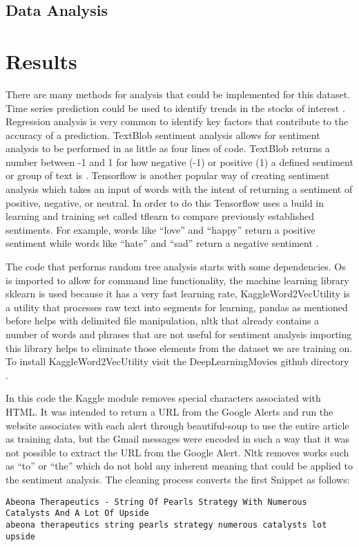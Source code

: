 \documentclass[sigconf]{acmart}
\begin{document}
\subsection{Data Analysis}



\section{Results}
There are many methods for analysis that could be implemented for this dataset. Time series prediction could be used to identify trends in the stocks of interest \cite{ARMANO}. Regression analysis is very common to identify key factors that contribute to the accuracy of a  prediction. TextBlob sentiment analysis allows for sentiment analysis to be performed in as little as four lines of code. TextBlob returns a number between -1 and 1 for how negative (-1) or positive (1) a defined sentiment or group of text is \cite{www-textblob}. Tensorflow is another popular way of creating sentiment analysis which takes an input of words with the intent of returning a sentiment of positive, negative, or neutral. In order to do this Tensorflow uses a build in learning and training set called tflearn to compare previously established sentiments. For example, words like ``love'' and ``happy'' return a positive sentiment while words like ``hate'' and ``sad'' return a negative sentiment \cite{www-oreilyTensor}. %

The code that performs random tree analysis starts with some dependencies. Os is imported to allow for command line functionality, the machine learning library sklearn is used because it has a very fast learning rate, KaggleWord2VecUtility is a utility that processes raw text into segments for learning, pandas as mentioned before helps with delimited file manipulation, nltk that already contains a number of words and phrases that are not useful for sentiment analysis importing this library helps to eliminate those elements from the dataset we are training on. To install KaggleWord2VecUtility visit the DeepLearningMovies github directory \cite{kaggle}. 

In this code the Kaggle module removes special characters associated with HTML. It was intended to return a URL from the Google Alerts and run the website associates with each alert through beautiful-soup to use the entire article as training data, but the Gmail messages were encoded in such a way that it was not possible to extract the URL from the Google Alert. Nltk removes works such as ``to'' or ``the'' which do not hold any inherent meaning that could be applied to the sentiment analysis. The cleaning process converts the first Snippet as follows:
\begin{mdframed}[style=default]
\begin{lstlisting}
Abeona Therapeutics - String Of Pearls Strategy With Numerous Catalysts And A Lot Of Upside
abeona therapeutics string pearls strategy numerous catalysts lot upside
\end{lstlisting}
\end{mdframed}
\end{document}
